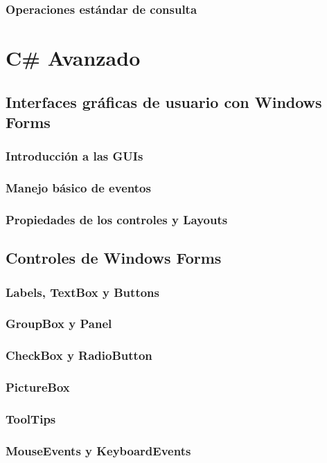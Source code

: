 \documentclass[12pt,a4paper]{report}
\begin{document}
\section{Operaciones estándar de consulta}

\part{C\# Avanzado}
\chapter{ Interfaces gráficas de usuario con Windows Forms}
\section{Introducción a las GUIs}
\section{Manejo básico de eventos}
\section{Propiedades de los controles y Layouts}

\chapter{Controles de Windows Forms}
\section{Labels, TextBox y Buttons}
\section{GroupBox y Panel}
\section{CheckBox y RadioButton}
\section{PictureBox}
\section{ToolTips}
\section{MouseEvents y KeyboardEvents}
\end{document}
